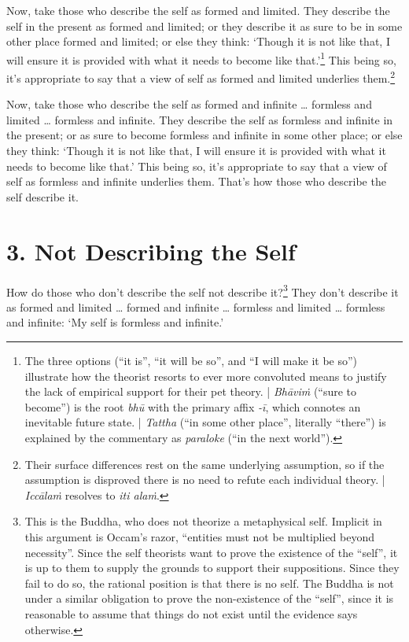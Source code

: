 \documentclass[12pt,openany]{book}%
\begin{document}
Now, take those who describe the self as formed and limited. They describe the self in the present as formed and limited; or they describe it as sure to be in some other place formed and limited; or else they think: ‘Though it is not like that, I will ensure it is provided with what it needs to become like that.’\footnote{The three options (“it is”, “it will be so”, and “I will make it be so”) illustrate how the theorist resorts to ever more convoluted means to justify the lack of empirical support for their pet theory. | \textit{\textsanskrit{Bhāviṁ}} (“sure to become”) is the root \textit{\textsanskrit{bhū}} with the primary affix \textit{-\textsanskrit{ī}}, which connotes an inevitable future state. | \textit{Tattha} (“in some other place”, literally “there”) is explained by the commentary as \textit{paraloke} (“in the next world”). } This being so, it’s appropriate to say that a view of self as formed and limited underlies them.\footnote{Their surface differences rest on the same underlying assumption, so if the assumption is disproved there is no need to refute each individual theory. | \textit{\textsanskrit{Iccālaṁ}} resolves to \textit{iti \textsanskrit{alaṁ}}. } 

Now, take those who describe the self as formed and infinite … formless and limited … formless and infinite. They describe the self as formless and infinite in the present; or as sure to become formless and infinite in some other place; or else they think: ‘Though it is not like that, I will ensure it is provided with what it needs to become like that.’ This being so, it’s appropriate to say that a view of self as formless and infinite underlies them. That’s how those who describe the self describe it. 

\section*{3. Not Describing the Self }

How do those who don’t describe the self not describe it?\footnote{This is the Buddha, who does not theorize a metaphysical self. Implicit in this argument is Occam’s razor, “entities must not be multiplied beyond necessity”. Since the self theorists want to prove the existence of the “self”, it is up to them to supply the grounds to support their suppositions. Since they fail to do so, the rational position is that there is no self. The Buddha is not under a similar obligation to prove the non-existence of the “self”, since it is reasonable to assume that things do not exist until the evidence says otherwise. } They don’t describe it as formed and limited … formed and infinite … formless and limited … formless and infinite: ‘My self is formless and infinite.’ 
\end{document}
